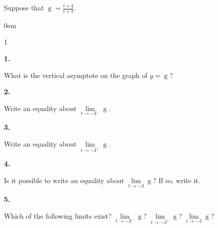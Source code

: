 \documentclass[12pt,]{book}
\theoremstyle{plain}
\theoremstyle{definition}
\numberwithin{equation}{section}
\newenvironment{exercisegroup}%
{\medskip\noindent}%
{\par\bigskip}%
\newlength{\exercisegroupindent}%
\newlength{\exercisegroupitemwidth}%
\newenvironment{exercisegrouplist}%
{\vspace{-\partopsep}%
\begin{adjustwidth}{\exercisegroupindent}{0em}}%
{\end{adjustwidth}%
\vspace{-\partopsep}%
\vspace{\baselineskip}}%
\newenvironment{exercisegroupbycol}[1]%
{\begin{exercisegrouplist}%
\vspace{-\multicolsep}%
\begin{multicols}{#1}%
\setlength{\parindent}{0em}%
\setlength{\exercisegroupitemwidth}{\linewidth}}%
{\end{multicols}%
\vspace{-\multicolsep}%
\end{exercisegrouplist}}%
\newenvironment{exercisegroupitem}[1]%
{\begin{minipage}[t]{\exercisegroupitemwidth}
\vspace{0pt}%
{\bfseries#1}%
\rule{0pt}{\baselineskip}}{\strut%
\end{minipage}%
\hspace{\columnsep}}%
\providecommand\phantomsection{}
\newcommand{\fe}[2]{\mathop{{#1}{\left(#2\right)}}}
\begin{document}
\begin{exercisegroup}%
Suppose that \(\fe{g}{t}=\frac{t+4}{t+3}\).%
\begin{exercisegroupbycol}{1}%
\begin{exercisegroupitem}{1. }\phantomsection\hypertarget{exercise-74}{\null}
What is the vertical asymptote on the graph of \(y=\fe{g}{t}\)?%
\end{exercisegroupitem}%
\par%
\begin{exercisegroupitem}{2. }\phantomsection\hypertarget{exercise-75}{\null}
Write an equality about \(\lim\limits_{t\to-3^{-}}\fe{g}{t}\).%
\end{exercisegroupitem}%
\par%
\begin{exercisegroupitem}{3. }\phantomsection\hypertarget{exercise-76}{\null}
Write an equality about \(\lim\limits_{t\to-3^{+}}\fe{g}{t}\).%
\end{exercisegroupitem}%
\par%
\begin{exercisegroupitem}{4. }\phantomsection\hypertarget{exercise-77}{\null}
Is it possible to write an equality about \(\lim\limits_{t\to-3}\fe{g}{t}\)? If so, write it.%
\end{exercisegroupitem}%
\par%
\begin{exercisegroupitem}{5. }\phantomsection\hypertarget{exercise-78}{\null}
Which of the following limits exist? \(\lim\limits_{t\to-3^{-}}\fe{g}{t}\)? \(\lim\limits_{t\to-3^{+}}\fe{g}{t}\)? \(\lim\limits_{t\to-3}\fe{g}{t}\)?%
\end{exercisegroupitem}%
\par%
\end{exercisegroupbycol}%
\end{exercisegroup}%
\end{document}

